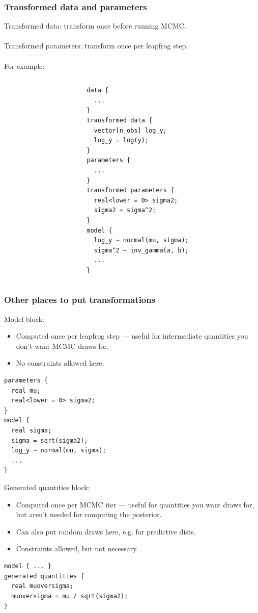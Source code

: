 \documentclass[xcolor=dvipsnames]{beamer}
\begin{document}
\begin{frame}[fragile]
\frametitle{Transformed data and parameters}
Transformed data: transform once before running MCMC.\\~\\

Transformed parameters: transform once per leapfrog step.\\~\\

For example:
\begin{columns}
\begin{column}{0.3\textwidth}
\end{column}
\begin{column}{0.7\textwidth}
{\tiny
\begin{verbatim}
data {
  ...
}
transformed data {
  vector[n_obs] log_y;
  log_y = log(y);
}
parameters {
  ...
}
transformed parameters {
  real<lower = 0> sigma2;
  sigma2 = sigma^2;
}
model {
  log_y ~ normal(mu, sigma);
  sigma^2 ~ inv_gamma(a, b);
  ...
}
\end{verbatim}
}
\end{column}
\end{columns}
\end{frame}

\begin{frame}[fragile]
\frametitle{Other places to put transformations}
Model block:
\begin{itemize}
\item Computed once per leapfrog step --- useful for intermediate quantities you don't want MCMC draws for.
\item No constraints allowed here.
\end{itemize}
{\tiny
\begin{verbatim}
parameters {
  real mu;
  real<lower = 0> sigma2;
}
model {
  real sigma;
  sigma = sqrt(sigma2);
  log_y ~ normal(mu, sigma);
  ...
}
\end{verbatim}
}
Generated quantities block:
\begin{itemize}
\item Computed once per MCMC iter --- useful for quantities you want draws for, but aren't needed for computing the posterior.
\item Can also put random draws here, e.g. for predictive dists.
\item Constraints allowed, but not necessary.
\end{itemize}
{\tiny
\begin{verbatim}
model { ... }
generated quantities {
  real muoversigma;
  muoversigma = mu / sqrt(sigma2);
}
\end{verbatim}
}
\end{frame}
\end{document}

